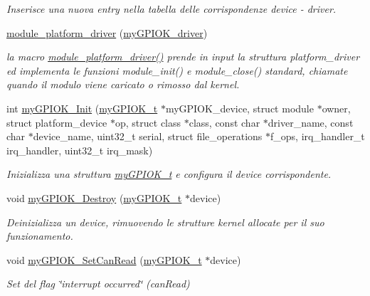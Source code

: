 \begin{DoxyCompactItemize}
\begin{DoxyCompactList}\small\item\em Inserisce una nuova entry nella tabella delle corrispondenze device -\/ driver. \end{DoxyCompactList}\item 
\hyperlink{group___linux-_driver_ga61e890be90fe5582db8048893ca0ebbf}{module\+\_\+platform\+\_\+driver} (\hyperlink{group___linux-_driver_ga8dba1541b58fa63f8208232ffce4fc47}{my\+G\+P\+I\+O\+K\+\_\+driver})
\begin{DoxyCompactList}\small\item\em la macro \hyperlink{group___linux-_driver_ga61e890be90fe5582db8048893ca0ebbf}{module\+\_\+platform\+\_\+driver()} prende in input la struttura platform\+\_\+driver ed implementa le funzioni module\+\_\+init() e module\+\_\+close() standard, chiamate quando il modulo viene caricato o rimosso dal kernel. \end{DoxyCompactList}\item 
int \hyperlink{group___linux-_driver_ga64afb2eff1f990814d792349842c522d}{my\+G\+P\+I\+O\+K\+\_\+\+Init} (\hyperlink{structmy_g_p_i_o_k__t}{my\+G\+P\+I\+O\+K\+\_\+t} $\ast$my\+G\+P\+I\+O\+K\+\_\+device, struct module $\ast$owner, struct platform\+\_\+device $\ast$op, struct class $\ast$class, const char $\ast$driver\+\_\+name, const char $\ast$device\+\_\+name, uint32\+\_\+t serial, struct file\+\_\+operations $\ast$f\+\_\+ops, irq\+\_\+handler\+\_\+t irq\+\_\+handler, uint32\+\_\+t irq\+\_\+mask)
\begin{DoxyCompactList}\small\item\em Inizializza una struttura \hyperlink{structmy_g_p_i_o_k__t}{my\+G\+P\+I\+O\+K\+\_\+t} e configura il device corrispondente. \end{DoxyCompactList}\item 
void \hyperlink{group___linux-_driver_ga24255b79dd8549aa655cf28c1f9a65d5}{my\+G\+P\+I\+O\+K\+\_\+\+Destroy} (\hyperlink{structmy_g_p_i_o_k__t}{my\+G\+P\+I\+O\+K\+\_\+t} $\ast$device)
\begin{DoxyCompactList}\small\item\em Deinizializza un device, rimuovendo le strutture kernel allocate per il suo funzionamento. \end{DoxyCompactList}\item 
void \hyperlink{group___linux-_driver_gad82c1051e6acb335b1b26ab0c459453b}{my\+G\+P\+I\+O\+K\+\_\+\+Set\+Can\+Read} (\hyperlink{structmy_g_p_i_o_k__t}{my\+G\+P\+I\+O\+K\+\_\+t} $\ast$device)
\begin{DoxyCompactList}\small\item\em Set del flag \char`\"{}interrupt occurred\char`\"{} (can\+Read) \end{DoxyCompactList}\item 

\end{DoxyCompactItemize}

